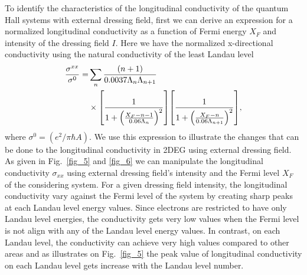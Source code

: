 
To identify the characteristics of the longitudinal conductivity of the quantum Hall systems with external dressing field, first we can derive an expression for a normalized
longitudinal conductivity as a function of Fermi energy $X_F$ and intensity of the dressing field $I$. Here we have the normalized x-directional conductivity using the natural conductivity of the least Landau level
\begin{equation} \label{eq_35}
  \begin{aligned}
    \frac{\sigma^{xx}}{\sigma^{0}} = &
    \sum_{n}
    \frac{\qty(n+1)}{0.0037\Lambda_n \Lambda_{n+1}} \\
    & \times
    \qty[
      \frac{1}
      {
        1 + \qty(\frac{X_F - n -1}{0.06\Lambda_n})^2
      }
    ]
    \qty[
      \frac{1}
      {
        1 + \qty(\frac{X_F - n}{0.06\Lambda_{n+1}})^2
      }
    ],
  \end{aligned}
\end{equation}
where $\sigma^0 = (e^2/\pi \hbar A)$. We use this expression to illustrate the changes that can be done to the longitudinal conductivity in 2DEG using external dressing field. As given in Fig.~\ref{fig_5} and \ref{fig_6} we can manipulate the longitudinal conductivity $\sigma_{xx}$ using external dressing field's intensity and the Fermi level $X_F$ of the considering system. For a given dressing field intensity, the longitudinal conductivity vary against the Fermi level of the system by creating sharp peaks at each Landau level energy values. Since electrons are restricted to have only Landau level energies, the conductivity gets very low values when the Fermi level is not align with any of the Landau level energy values. In contrast, on each Landau level, the conductivity can achieve very high values compared to other areas and as illustrates on Fig.~\ref{fig_5} the peak value of longitudinal conductivity on each Landau level gets increase with the Landau level number.

